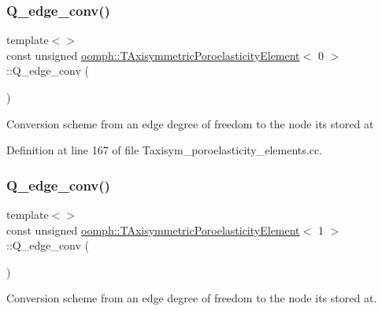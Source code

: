 \subsubsection{\texorpdfstring{Q\+\_\+edge\+\_\+conv()}{Q\_edge\_conv()}\hspace{0.1cm}{\footnotesize\ttfamily [1/2]}}
{\footnotesize\ttfamily template$<$$>$ \\
const unsigned \hyperlink{classoomph_1_1TAxisymmetricPoroelasticityElement}{oomph\+::\+T\+Axisymmetric\+Poroelasticity\+Element}$<$ 0 $>$\+::Q\+\_\+edge\+\_\+conv (\begin{DoxyParamCaption}{ }\end{DoxyParamCaption})\hspace{0.3cm}{\ttfamily [private]}}

Conversion scheme from an edge degree of freedom to the node it\textquotesingle{}s stored at 

Definition at line 167 of file Taxisym\+\_\+poroelasticity\+\_\+elements.\+cc.

\mbox{\label{classoomph_1_1TAxisymmetricPoroelasticityElement_ac69d7e0179db6881c04d702075e7b54b}} 
\subsubsection{\texorpdfstring{Q\+\_\+edge\+\_\+conv()}{Q\_edge\_conv()}\hspace{0.1cm}{\footnotesize\ttfamily [2/2]}}
{\footnotesize\ttfamily template$<$$>$ \\
const unsigned \hyperlink{classoomph_1_1TAxisymmetricPoroelasticityElement}{oomph\+::\+T\+Axisymmetric\+Poroelasticity\+Element}$<$ 1 $>$\+::Q\+\_\+edge\+\_\+conv (\begin{DoxyParamCaption}{ }\end{DoxyParamCaption})\hspace{0.3cm}{\ttfamily [private]}}



Conversion scheme from an edge degree of freedom to the node it\textquotesingle{}s stored at. 



